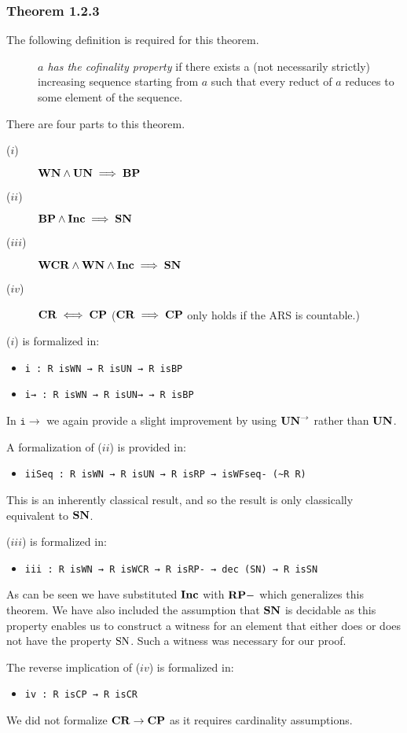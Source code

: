\subsubsection{Theorem 1.2.3}
The following definition is required for this theorem.
\begin{definition}\hfill
    \begin{description}
        \item[] \emph{$a$ has the cofinality property} if there exists a 
        (not necessarily strictly) increasing sequence starting from $a$ such that every
        reduct of $a$ reduces to some element of the sequence.
    \end{description}
\end{definition}

There are four parts to this theorem. 
\begin{description}
    \item[($i$)] $\mathbf{WN} \land \mathbf{UN} \implies \mathbf{BP}$
    \item[($ii$)] $\mathbf{BP} \land \mathbf{Inc} \implies \mathbf{SN}$  
    \item[($iii$)] $\mathbf{WCR} \land \mathbf{WN} \land \mathbf{Inc} \implies \mathbf{SN}$
    \item[($iv$)] $\mathbf{CR} \iff \mathbf{CP}$ ($\mathbf{CR} \implies \mathbf{CP}$ only holds if the ARS is countable.)
\end{description}

($i$) is formalized in: 
\begin{itemize}
    \item \verb|i : R isWN → R isUN → R isBP|
    \item \verb|i→ : R isWN → R isUN→ → R isBP|
\end{itemize}

In $\mathtt{i\to}$ we again provide a slight improvement by using $\mathbf{UN}^{\to}$ rather than $\mathbf{UN}$.

A formalization of ($ii$) is provided in: 
\begin{itemize}
    \item \verb|iiSeq : R isWN → R isUN → R isRP → isWFseq- (~R R)|
\end{itemize}
This is an inherently classical result, and so the result is only classically equivalent to $\mathbf{SN}$.

($iii$) is formalized in: 
\begin{itemize}
    \item \verb|iii : R isWN → R isWCR → R isRP- → dec (SN) → R isSN|
\end{itemize}
As can be seen we have substituted $\mathbf{Inc}$ with $\mathbf{RP{-}}$ which generalizes this theorem. We have also included the assumption that $\mathbf{SN}$ 
is decidable as this property enables us 
to construct a witness for an element that either does or does not have the property $\mathrm{SN}$. Such a witness was necessary for our proof. 


The reverse implication of ($iv$) is formalized in: 
\begin{itemize}
    \item \verb|iv : R isCP → R isCR|
\end{itemize}
We did not formalize $\mathbf{CR} \to \mathbf{CP}$ as it requires cardinality assumptions.



